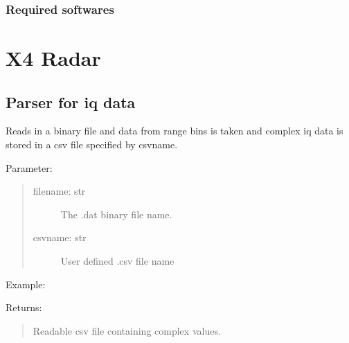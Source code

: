\documentclass[letterpaper,10pt,english]{sphinxmanual}
\begin{document}
\subsubsection{Required softwares}
\label{\detokenize{radar information:required-softwares}}


\section{X4 Radar}
\label{\detokenize{X4 radar:x4-radar}}\label{\detokenize{X4 radar::doc}}

\subsection{Parser for iq data}
\label{\detokenize{X4 radar:module-X4_parser}}\label{\detokenize{X4 radar:parser-for-iq-data}}

\begin{fulllineitems}
\label{\detokenize{X4 radar:X4_parser.iq_data}}
Reads in a binary file and data from range bins is taken and complex iq data is stored in a csv file specified by csvname.

Parameter:
\begin{quote}
\begin{description}
\item[{filename: str}] \leavevmode
The .dat binary file name.

\item[{csvname: str}] \leavevmode
User defined .csv file name

\end{description}
\end{quote}

Example:

\begin{sphinxVerbatim}[commandchars=\\\{\}]
\end{sphinxVerbatim}

Returns:
\begin{quote}

Readable csv file containing complex values.
\end{quote}

\end{fulllineitems}
\end{document}

